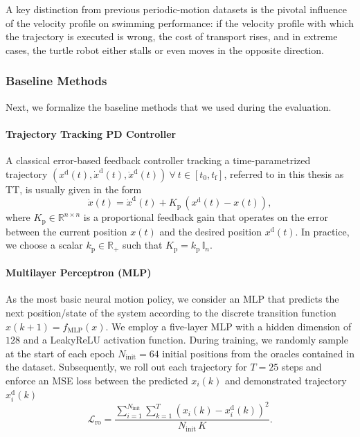 A key distinction from previous periodic-motion datasets is the pivotal influence of the velocity profile on swimming performance: if the velocity profile with which the trajectory is executed is wrong, the cost of transport rises, and in extreme cases, the turtle robot either stalls or even moves in the opposite direction.

\subsubsection{Baseline Methods}
Next, we formalize the baseline methods that we used during the evaluation.
\paragraph{Trajectory Tracking PD Controller}
A classical error-based feedback controller tracking a time-parametrized trajectory $(x^\mathrm{d}(t), \dot{x}^\mathrm{d}(t), \ddot{x}^\mathrm{d}(t)) \: \forall \: t \in [t_0, t_\mathrm{f}]$, referred to in this thesis as \gls{TT}, is usually given in the form
\begin{equation}\label{eq:osmp:trajectory_tracking_controller}
    \dot{x}(t) = \dot{x}^\mathrm{d}(t) + K_\mathrm{p} \, (x^\mathrm{d}(t) - x(t)),
\end{equation}
where $K_\mathrm{p} \in \mathbb{R}^{n \times n}$ is a proportional feedback gain that operates on the error between the current position $x(t)$ and the desired position $x^\mathrm{d}(t)$. In practice, we choose a scalar $k_\mathrm{p} \in \mathbb{R}_+$ such that $K_\mathrm{p} = k_\mathrm{p} \, \mathbb{I}_{n}$.

\paragraph{Multilayer Perceptron (MLP)}
As the most basic neural motion policy, we consider an \gls{MLP} that predicts the next position/state of the system according to the discrete transition function $x(k+1) = f_\mathrm{MLP}(x)$. We employ a five-layer MLP with a hidden dimension of $128$ and a LeakyReLU activation function.
During training, we randomly sample at the start of each epoch $N_\mathrm{init} = 64$ initial positions from the oracles contained in the dataset. Subsequently, we roll out each trajectory for $T = 25$ steps and enforce an \gls{MSE} loss between the predicted $x_i(k)$ and demonstrated trajectory $x_i^\mathrm{d}(k)$
\begin{equation}
    \mathcal{L}_\mathrm{ro} = \frac{\sum_{i = 1}^{N_\mathrm{init}}\sum_{k=1}^{T} \left ( x_i(k) - x_i^\mathrm{d}(k) \right )^2}{N_\mathrm{init} \, K}.
\end{equation}


